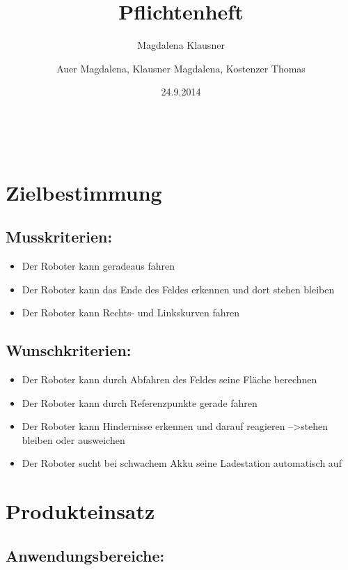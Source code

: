 \documentclass[12pt,a4paper]{article}
\author{Magdalena Klausner}
\newcommand{\changefont}[3]{
\fontfamily{#1}
\fontseries{#2}
\fontshape{#3}
\selectfont}
\begin{document}
\changefont{cmss}{m}{n}

\title{ Pflichtenheft}
\author{Auer Magdalena, Klausner Magdalena, Kostenzer Thomas }
\date{24.9.2014}
{\centering{}\\}

\newpage
\tableofcontents
\newpage


\section{ Zielbestimmung}
\subsection{ Musskriterien:}

\begin{itemize}
\item Der Roboter kann geradeaus fahren 
\item Der Roboter kann das Ende des Feldes erkennen und dort stehen bleiben
\item Der Roboter kann Rechts- und Linkskurven fahren
\end{itemize}


\subsection{Wunschkriterien:}
\begin{itemize}
\item Der Roboter kann durch Abfahren des Feldes seine Fläche berechnen 
\item Der Roboter kann durch Referenzpunkte gerade fahren
\item Der Roboter kann Hindernisse erkennen und darauf reagieren  --\textgreater stehen bleiben oder ausweichen
\item Der Roboter sucht bei schwachem Akku seine Ladestation automatisch auf 
\end{itemize}


\section{ Produkteinsatz}

\subsection{Anwendungsbereiche:}
\end{document}
